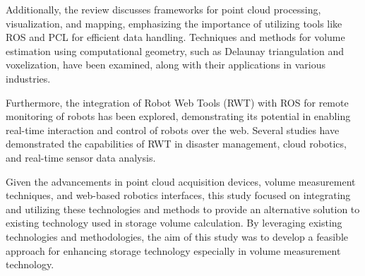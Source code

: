 Additionally, the review discusses frameworks for point cloud processing, visualization, and mapping, emphasizing the importance of utilizing tools like ROS and PCL for efficient data handling. Techniques and methods for volume estimation using computational geometry, such as Delaunay triangulation and voxelization, have been examined, along with their applications in various industries.

Furthermore, the integration of Robot Web Tools (RWT) with ROS for remote monitoring of robots has been explored, demonstrating its potential in enabling real-time interaction and control of robots over the web. Several studies have demonstrated the capabilities of RWT in disaster management, cloud robotics, and real-time sensor data analysis.

Given the advancements in point cloud acquisition devices, volume measurement techniques, and web-based robotics interfaces, this study focused on integrating and utilizing these technologies and methods to provide an alternative solution to existing technology used in storage volume calculation. By leveraging existing technologies and methodologies, the aim of this study was to develop a feasible approach for enhancing storage technology especially in volume measurement technology.

